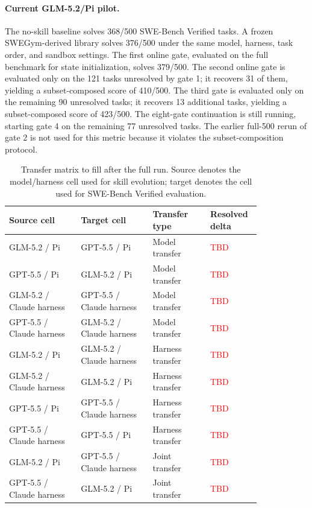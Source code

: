 \documentclass{article}
\newcommand{\tbd}{\textcolor{red}{TBD}}
\begin{document}
\paragraph{Current GLM-5.2/Pi pilot.}
The no-skill baseline solves 368/500 SWE-Bench Verified tasks. A frozen
SWEGym-derived library solves 376/500 under the same model, harness, task order,
and sandbox settings. The first online gate, evaluated on the full benchmark for
state initialization, solves 379/500. The second online gate is evaluated only
on the 121 tasks unresolved by gate 1; it recovers 31 of them, yielding a
subset-composed score of 410/500. The third gate is evaluated only on the
remaining 90 unresolved tasks; it recovers 13 additional tasks, yielding a
subset-composed score of 423/500. The eight-gate continuation is still running,
starting gate 4 on the remaining 77 unresolved tasks. The earlier full-500
rerun of gate 2 is not used for this metric because it violates the
subset-composition protocol.

\begin{table}[h]
\caption{Transfer matrix to fill after the full run. Source denotes the
model/harness cell used for skill evolution; target denotes the cell used for
SWE-Bench Verified evaluation.}
\label{tab:transfer}
\begin{center}
\begin{tabular}{L{0.25\linewidth} L{0.25\linewidth} L{0.20\linewidth} C{0.13\linewidth}}
\toprule
Source cell & Target cell & Transfer type & Resolved delta \\
\midrule
GLM-5.2 / Pi & GPT-5.5 / Pi & Model transfer & \tbd \\
GPT-5.5 / Pi & GLM-5.2 / Pi & Model transfer & \tbd \\
GLM-5.2 / Claude harness & GPT-5.5 / Claude harness & Model transfer & \tbd \\
GPT-5.5 / Claude harness & GLM-5.2 / Claude harness & Model transfer & \tbd \\
GLM-5.2 / Pi & GLM-5.2 / Claude harness & Harness transfer & \tbd \\
GLM-5.2 / Claude harness & GLM-5.2 / Pi & Harness transfer & \tbd \\
GPT-5.5 / Pi & GPT-5.5 / Claude harness & Harness transfer & \tbd \\
GPT-5.5 / Claude harness & GPT-5.5 / Pi & Harness transfer & \tbd \\
GLM-5.2 / Pi & GPT-5.5 / Claude harness & Joint transfer & \tbd \\
GPT-5.5 / Claude harness & GLM-5.2 / Pi & Joint transfer & \tbd \\
\bottomrule
\end{tabular}
\end{center}
\end{table}
\end{document}
